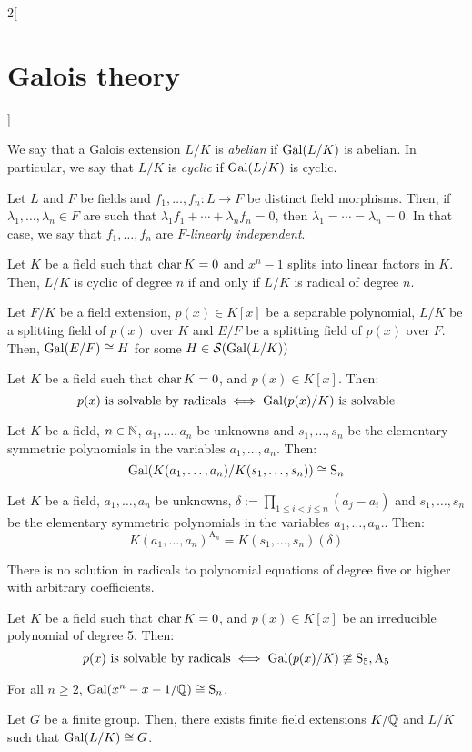 \documentclass[../../../main_math.tex]{subfiles}
\begin{document}
\begin{multicols}{2}[\section{Galois theory}]
  \begin{definition}
    We say that a Galois extension $L/K$ is \emph{abelian} if $\operatorname{Gal}(L/K)$ is abelian. In particular, we say that $L/K$ is \emph{cyclic} if $\operatorname{Gal}(L/K)$ is cyclic.
  \end{definition}
  \begin{lemma}
    Let $L$ and $F$ be fields and $f_1,\ldots,f_n:L\rightarrow F$ be distinct field morphisms. Then, if $\lambda_1,\ldots,\lambda_n\in F$ are such that $\lambda_1f_1+\cdots+\lambda_nf_n=0$, then $\lambda_1=\cdots=\lambda_n=0$. In that case, we say that $f_1,\ldots,f_n$ are \emph{$F$-linearly independent}.
  \end{lemma}
  \begin{theorem}
    Let $K$ be a field such that $\operatorname{char} K=0$ and $x^n-1$ splits into linear factors in $K$. Then, $L/K$ is cyclic of degree $n$ if and only if $L/K$ is radical of degree $n$.
  \end{theorem}
  \begin{lemma}
    Let $F/K$ be a field extension, $p(x)\in K[x]$ be a separable polynomial, $L/K$ be a splitting field of $p(x)$ over $K$ and $E/F$ be a splitting field of $p(x)$ over $F$. Then, $\operatorname{Gal}(E/F)\cong H$ for some $H\in\mathcal{S}(\operatorname{Gal}(L/K))$
  \end{lemma}
  \begin{theorem}
    Let $K$ be a field such that $\operatorname{char} K=0$, and $p(x)\in K[x]$. Then: $$p(x)\text{ is solvable by radicals}\iff\operatorname{Gal}(p(x)/K)\text{ is solvable}$$
  \end{theorem}
  \begin{lemma}
    Let $K$ be a field, $n\in\mathbb{N}$, $a_1,\ldots,a_n$ be unknowns and $s_1,\ldots,s_n$ be the elementary symmetric polynomials in the variables $a_1,\ldots,a_n$. Then: $$\operatorname{Gal}(K(a_1,\ldots,a_n)/K(s_1,\ldots,s_n))\cong \text{S}_n$$
  \end{lemma}
  \begin{corollary}
    Let $K$ be a field, $a_1,\ldots,a_n$ be unknowns, $\delta:=\prod_{1\leq i<j\leq n}(a_j-a_i)$ and $s_1,\ldots,s_n$ be the elementary symmetric polynomials in the variables $a_1,\ldots,a_n$.. Then: $${K(a_1,\ldots,a_n)}^{\text{A}_n}=K(s_1,\ldots,s_n)(\delta)$$
  \end{corollary}
  \begin{theorem}
    There is no solution in radicals to polynomial equations of degree five or higher with arbitrary coefficients.
  \end{theorem}
  \begin{proposition}
    Let $K$ be a field such that $\operatorname{char} K=0$, and $p(x)\in K[x]$ be an irreducible polynomial of degree 5. Then:
    $$p(x)\text{ is solvable by radicals}\iff\operatorname{Gal}(p(x)/K)\ncong\text{S}_5,\text{A}_5$$
  \end{proposition}
  \begin{theorem}
    For all $n\geq 2$, $\operatorname{Gal}(x^n-x-1/\mathbb{Q})\cong \text{S}_n$.
  \end{theorem}
  \begin{corollary}
    Let $G$ be a finite group. Then, there exists finite field extensions $K/\mathbb{Q}$ and $L/K$ such that $\operatorname{Gal}(L/K)\cong G$.
  \end{corollary}

\end{multicols}
\end{document}

